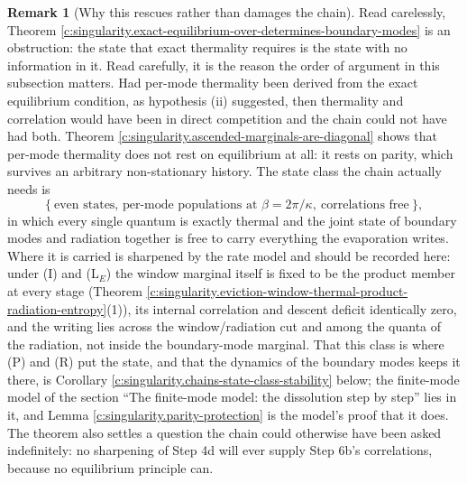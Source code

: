 \documentclass[11pt]{article}
\theoremstyle{definition}
\newtheorem{remark}[theorem]{Remark}
\theoremstyle{plain}
\begin{document}
\begin{remark}[Why this rescues rather than damages the chain]\label{c:note.singularity.why-rescues-rather-than-damages-chain}
Read carelessly, Theorem \ref{c:singularity.exact-equilibrium-over-determines-boundary-modes} is an obstruction: the state that exact thermality requires is the state with no information in it. Read carefully, it is the reason the order of argument in this subsection matters. Had per-mode thermality been derived from the exact equilibrium condition, as hypothesis (ii) suggested, then thermality and correlation would have been in direct competition and the chain could not have had both. Theorem \ref{c:singularity.ascended-marginals-are-diagonal} shows that per-mode thermality does not rest on equilibrium at all: it rests on parity, which survives an arbitrary non-stationary history. The state class the chain actually needs is
\[
\bigl\{\ \text{even states, per-mode populations at } \beta = 2\pi/\kappa, \ \text{correlations free}\ \bigr\},
\]
in which every single quantum is exactly thermal and the joint state of boundary modes and radiation together is free to carry everything the evaporation writes. Where it is carried is sharpened by the rate model and should be recorded here: under (I) and (L$_E$) the window marginal itself is fixed to be the product member at every stage (Theorem \ref{c:singularity.eviction-window-thermal-product-radiation-entropy}(1)), its internal correlation and descent deficit identically zero, and the writing lies across the window/radiation cut and among the quanta of the radiation, not inside the boundary-mode marginal. That this class is where (P) and (R) put the state, and that the dynamics of the boundary modes keeps it there, is Corollary \ref{c:singularity.chains-state-class-stability} below; the finite-mode model of the section ``The finite-mode model: the dissolution step by step'' lies in it, and Lemma \ref{c:singularity.parity-protection} is the model's proof that it does. The theorem also settles a question the chain could otherwise have been asked indefinitely: no sharpening of Step 4d will ever supply Step 6b's correlations, because no equilibrium principle can.
\end{remark}
\end{document}
